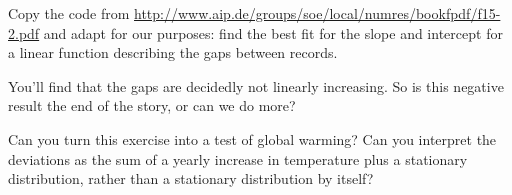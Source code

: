 \begin{exercise}
  Copy the code from
  \url{http://www.aip.de/groups/soe/local/numres/bookfpdf/f15-2.pdf} and
  adapt for our purposes: find the best fit for the slope and
  intercept for a linear function describing the gaps between records.
\end{exercise}

You'll find that the gaps are decidedly not linearly increasing.
So is this negative result the end of the story, or can we do more?

\begin{exercise}
  Can you turn this exercise into a test of global warming? Can you
  interpret the deviations as the sum of a yearly increase in temperature
  plus a stationary distribution, rather than a stationary
  distribution by itself?
\end{exercise}
